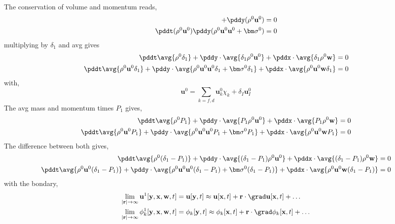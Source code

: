 The conservation of volume and momentum reads, 
\begin{align*}
    + \pddy( \rho^0\textbf{u}^0)
    = 0\\ 
    \pddt (\rho^0 \textbf{u}^0)
    \pddy (\rho^0 \textbf{u}^0\textbf{u}^0 + \bm\sigma^0)
    = 0
\end{align*}
multiplying by $\delta_1$ and avg gives
\begin{align*}
    \pddt \avg{\rho^0\delta_1}
    + \pddy\cdot\avg{\delta_1\rho^0\textbf{u}^0}
    + \pddx\cdot\avg{\delta_1\rho^0\textbf{w}}
    = 0\\ 
    \pddt \avg{\rho^0 \textbf{u}^0\delta_1}
    + \pddy\cdot \avg{\rho^0 \textbf{u}^0\textbf{u}^0\delta_1 + \bm\sigma^0\delta_1}
    + \pddx\cdot \avg{\rho^0 \textbf{u}^0 \textbf{w}\delta_1}
    = 0
\end{align*}
with, 
\begin{equation*}
    \textbf{u}^0 
    = \sum_{k=f,d}
    \textbf{u}_k^0\chi_k
    + \delta_I \textbf{u}_I^0
\end{equation*}
The avg mass and momentum times $P_1$ gives, 
\begin{align*}
    \pddt \avg{\rho^0P_1}
    + \pddy\cdot\avg{P_1\rho^0\textbf{u}^0}
    + \pddx\cdot\avg{P_1\rho^0\textbf{w}}
    = 0\\ 
    \pddt \avg{\rho^0 \textbf{u}^0 P_1}
    + \pddy\cdot \avg{\rho^0 \textbf{u}^0\textbf{u}^0P_1 + \bm\sigma^0 P_1}
    + \pddx\cdot \avg{\rho^0 \textbf{u}^0 \textbf{w}P_1}
    = 0
\end{align*}
The difference between both gives, 
\begin{align*}
    \pddt \avg{\rho^0(\delta_1 - P_1)}
    + \pddy\cdot\avg{(\delta_1 - P_1)\rho^0\textbf{u}^0}
    + \pddx\cdot\avg{(\delta_1 - P_1)\rho^0\textbf{w}}
    = 0\\ 
    \pddt \avg{\rho^0 \textbf{u}^0 (\delta_1 - P_1)}
    + \pddy\cdot \avg{\rho^0 \textbf{u}^0\textbf{u}^0(\delta_1 - P_1) + \bm\sigma^0 (\delta_1 - P_1)}
    + \pddx\cdot \avg{\rho^0 \textbf{u}^0 \textbf{w}(\delta_1 - P_1)}
    = 0
\end{align*}
with the bondary, 
\begin{align}
    \lim_{|\textbf{r}| \to \infty}  \textbf{u}^1[\textbf{y},\textbf{x},\textbf{w},t]
    &= \textbf{u}[\textbf{y},t]
    \approx \textbf{u}[\textbf{x},t]
    + \textbf{r}\cdot \grad \textbf{u}[\textbf{x},t] 
    + \ldots\\
    \lim_{|\textbf{r}| \to \infty}  \phi_k^1[\textbf{y},\textbf{x},\textbf{w},t]
    &= \phi_k[\textbf{y},t]
    \approx \phi_k[\textbf{x},t]
    + \textbf{r}\cdot \grad \phi_k[\textbf{x},t] 
    + \ldots
\end{align}
